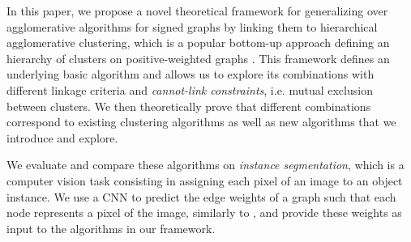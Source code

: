 
In this paper, we propose a novel theoretical framework for generalizing over agglomerative algorithms for signed graphs by linking them to hierarchical agglomerative clustering, which is a popular bottom-up approach defining an hierarchy of clusters on positive-weighted graphs \cite{lance1967general}. This framework defines an underlying basic algorithm and allows us to explore its combinations with different linkage criteria and \emph{cannot-link constraints}, i.e. mutual exclusion between clusters. We then theoretically prove that different combinations correspond to existing clustering algorithms as well as new algorithms that we introduce and explore. %

We evaluate and compare these algorithms on \emph{instance segmentation}, which is a computer vision task consisting in assigning each pixel of an image to an object instance. %
We use a CNN to predict the edge weights of a graph such that each node represents a pixel of the image, similarly to \cite{liu2018affinity,lee2017superhuman,wolf2018mutex}, and provide these weights as input to the algorithms in our framework.

